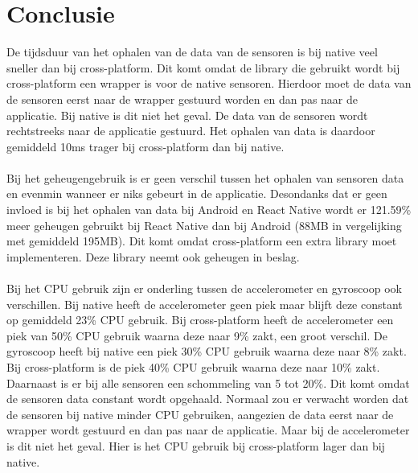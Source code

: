 \section{Conclusie}
De tijdsduur van het ophalen van de data van de sensoren is bij native veel sneller dan bij cross-platform.
Dit komt omdat de library die gebruikt wordt bij cross-platform een wrapper is voor de native sensoren.
Hierdoor moet de data van de sensoren eerst naar de wrapper gestuurd worden en dan pas naar de applicatie.
Bij native is dit niet het geval. De data van de sensoren wordt rechtstreeks naar de applicatie gestuurd.
Het ophalen van data is daardoor gemiddeld 10ms trager bij cross-platform dan bij native.
\\\\
Bij het geheugengebruik is er geen verschil tussen het ophalen van sensoren data en evenmin wanneer er 
niks gebeurt in de applicatie. Desondanks dat er geen invloed is bij het ophalen van data bij 
Android en React Native wordt er 121.59\% meer geheugen gebruikt bij React Native dan 
bij Android (88MB in vergelijking met gemiddeld 195MB). Dit komt omdat cross-platform een extra 
library moet implementeren. Deze library neemt ook geheugen in beslag.
\\\\
Bij het CPU gebruik zijn er onderling tussen de accelerometer en gyroscoop ook verschillen. Bij native 
heeft de accelerometer geen piek maar blijft deze constant op gemiddeld 23\% CPU gebruik. Bij cross-platform heeft
de accelerometer een piek van 50\% CPU gebruik waarna deze naar 9\% zakt, een groot verschil. 
De gyroscoop heeft bij native een piek 30\% CPU gebruik waarna deze naar 8\% zakt. Bij cross-platform
is de piek 40\% CPU gebruik waarna deze naar 10\% zakt. Daarnaast is er bij alle sensoren een schommeling van 5 tot 20\%. 
Dit komt omdat de sensoren data constant wordt opgehaald. Normaal zou er verwacht worden dat de sensoren bij native 
minder CPU gebruiken, aangezien de data eerst naar de wrapper wordt gestuurd en dan pas naar de applicatie. Maar bij 
de accelerometer is dit niet het geval. Hier is het CPU gebruik bij cross-platform lager dan bij native.

